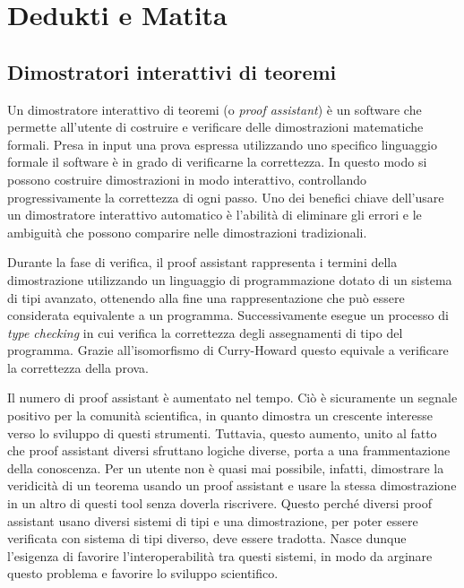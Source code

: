 \documentclass[12pt,a4paper]{mimosis}
\begin{document}
\section{Dedukti e Matita}\label{proofAssistant}
\subsection{Dimostratori interattivi di teoremi} 
Un dimostratore interattivo di teoremi (o \textit{proof assistant}) è un software 
che permette all'utente di costruire e verificare delle dimostrazioni matematiche
formali. Presa in input una prova espressa utilizzando uno specifico linguaggio 
formale il software è in grado di
verificarne la correttezza. In questo modo si possono costruire dimostrazioni
in modo interattivo, controllando progressivamente la correttezza di ogni passo.
Uno dei benefici chiave dell'usare un dimostratore interattivo automatico è l'abilità
di eliminare gli errori e le ambiguità che possono comparire nelle 
dimostrazioni tradizionali.

Durante la fase di verifica, il proof assistant rappresenta 
i termini della dimostrazione utilizzando un linguaggio di programmazione dotato di
un sistema di tipi avanzato, ottenendo alla fine una rappresentazione che può essere
considerata equivalente a un programma. Successivamente esegue un processo di \textit{
  type checking} in cui verifica la correttezza degli assegnamenti di tipo del programma.
Grazie all'isomorfismo di Curry-Howard questo equivale a verificare la correttezza della 
prova.

Il numero di proof assistant è aumentato nel tempo. Ciò è sicuramente un segnale
positivo per la comunità scientifica, in quanto dimostra un crescente interesse
verso lo sviluppo di questi strumenti. Tuttavia, questo aumento, unito al fatto
che proof assistant diversi sfruttano logiche diverse, porta a una frammentazione
della conoscenza. Per un utente non è quasi mai possibile, infatti, dimostrare la
veridicità di un teorema usando un proof assistant e usare la stessa dimostrazione
in un altro di questi tool senza doverla riscrivere.
Questo perché diversi proof assistant usano diversi sistemi di tipi e una dimostrazione,
per poter essere verificata con sistema di tipi diverso, deve essere tradotta.
Nasce dunque l'esigenza di favorire l'interoperabilità tra questi sistemi, in
modo da arginare questo problema e favorire lo sviluppo scientifico. 
\end{document}
